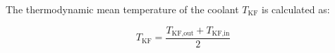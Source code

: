The thermodynamic mean temperature of the coolant \( T_{\text{KF}} \) is calculated as:  

\[
T_{\text{KF}} = \frac{T_{\text{KF,out}} + T_{\text{KF,in}}}{2}
\]